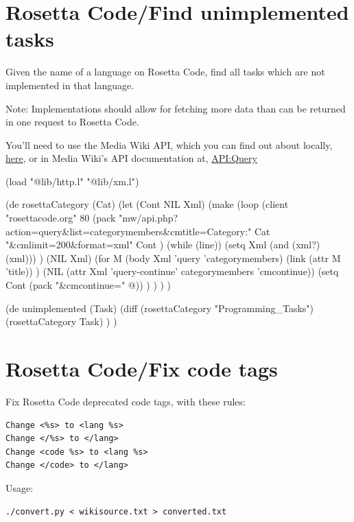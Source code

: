 \pagebreak{}
\section*{Rosetta Code/Find unimplemented tasks}

Given the name of a language on Rosetta Code, find all tasks which are
not implemented in that language.

Note: Implementations should allow for fetching more data than can be
returned in one request to Rosetta Code.

You'll need to use the Media Wiki API, which you can find out about
locally, \href{http://rosettacode.org/mw/api.php}{here}, or in Media
Wiki's API documentation at,
\href{http://www.mediawiki.org/wiki/API\_Query}{API:Query}

\begin{wideverbatim}

(load "@lib/http.l" "@lib/xm.l")

(de rosettaCategory (Cat)
   (let (Cont NIL  Xml)
      (make
         (loop
            (client "rosettacode.org" 80
               (pack
                  "mw/api.php?action=query\&list=categorymembers\&cmtitle=Category:"
                  Cat
                  "\&cmlimit=200\&format=xml"
                  Cont )
               (while (line))
               (setq Xml (and (xml?) (xml))) )
            (NIL Xml)
            (for M (body Xml 'query 'categorymembers)
               (link (attr M 'title)) )
            (NIL (attr Xml 'query-continue' categorymembers 'cmcontinue))
            (setq Cont (pack "\&cmcontinue=" @)) ) ) ) )

(de unimplemented (Task)
   (diff
      (rosettaCategory "Programming_Tasks")
      (rosettaCategory Task) ) )

\end{wideverbatim}

\pagebreak{}
\section*{Rosetta Code/Fix code tags}

Fix Rosetta Code deprecated code tags, with these rules:

\begin{verbatim}
Change <%s> to <lang %s>
Change </%s> to </lang>
Change <code %s> to <lang %s>
Change </code> to </lang>
\end{verbatim}

Usage:

\begin{verbatim}
./convert.py < wikisource.txt > converted.txt
\end{verbatim}


